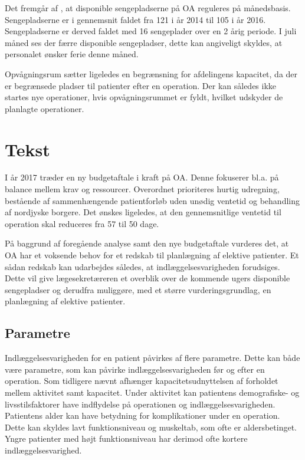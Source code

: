 Det fremgår af , at disponible sengepladserne på OA reguleres på månedsbasis. Sengepladserne er i gennemsnit faldet fra 121 i år 2014 til 105 i år 2016. Sengepladserne er derved faldet med 16 sengeplader over en 2 årig periode. I juli måned ses der færre disponible sengepladser, dette kan angiveligt skyldes, at personalet ønsker ferie denne måned. 

Opvågningsrum sætter ligeledes en begrænsning for afdelingens kapacitet, da der er begrænsede pladser til patienter efter en operation. Der kan således ikke startes nye operationer, hvis opvågningsrummet er fyldt, hvilket udskyder de planlagte operationer. 

\section{Tekst}
I år 2017 træder en ny budgetaftale i kraft på OA. Denne fokuserer bl.a. på balance mellem krav og ressourcer. Overordnet prioriteres hurtig udregning, bestående af sammenhængende patientforløb uden unødig ventetid og behandling af nordjyske borgere. Det ønskes ligeledes, at den gennemsnitlige ventetid til operation skal reduceres fra 57 til 50 dage. 

På baggrund af foregående analyse samt den nye budgetaftale vurderes det, at OA har et voksende behov for et redskab til planlægning af elektive patienter. Et sådan redskab kan udarbejdes således, at indlæggelsesvarigheden forudsiges. Dette vil give lægesekretæreren et overblik over de kommende ugers  disponible sengepladser og derudfra muliggøre, med et større vurderingsgrundlag, en planlægning af elektive patienter.

\subsection{Parametre}
Indlæggelsesvarigheden for en patient påvirkes af flere parametre. Dette kan både være parametre, som kan påvirke indlæggelsesvarigheden før og efter en operation. Som tidligere nævnt afhænger kapacitetsudnyttelsen af forholdet mellem aktivitet samt kapacitet. Under aktivitet kan patientens demografiske- og livsstilsfaktorer have indflydelse på operationen og indlæggelsesvarigheden.
Patientens alder kan have betydning for komplikationer under en operation. Dette kan skyldes lavt funktionsniveau og muskeltab, som ofte er aldersbetinget. Yngre patienter med højt funktionsniveau har derimod ofte kortere indlæggelsesvarighed.\cite{Kehlet2001 Janssen2002} \\


